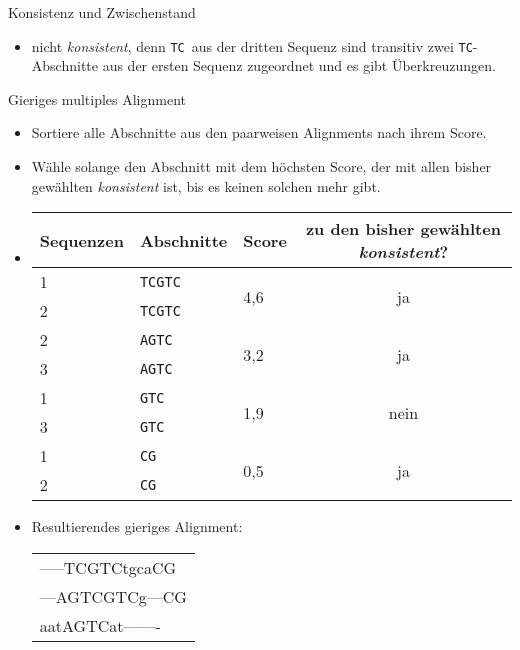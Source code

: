 \documentclass[wide,xcolor={x11names},hyperref={colorlinks=false},pantone312]{beamer}
\begin{document}
\begin{frame}[t, fragile]{Konsistenz und Zwischenstand}
	\vspace{1cm}
	\footnotesize
	\normalsize
	\begin{itemize}
		\item nicht \emph{konsistent}, denn \glqq\texttt{TC}\grqq \ aus der dritten Sequenz sind transitiv zwei \glqq\texttt{TC}\grqq-Abschnitte aus der ersten Sequenz zugeordnet und es gibt Überkreuzungen.
	\end{itemize}
\end{frame}

\begin{frame}[t]{Gieriges multiples Alignment}
	\footnotesize
	\begin{itemize}
		\item Sortiere alle Abschnitte aus den paarweisen Alignments nach ihrem Score.
		\item Wähle solange den Abschnitt mit dem höchsten Score, der mit allen bisher gewählten \emph{konsistent} ist, bis es keinen solchen mehr gibt. \pause
		\item
			\begin{tabular}{lllc}
				Sequenzen & Abschnitte & Score & zu den bisher gewählten \emph{konsistent}? \\
				\hline
				1 & \texttt{TCGTC} & \multirow{2}{*}{4,6} & \multirow{2}{*}{ja} \\
				2 & \texttt{TCGTC} &  &  \\
				2 & \texttt{AGTC}  & \multirow{2}{*}{3,2} & \multirow{2}{*}{ja} \\
				3 & \texttt{AGTC}  &  &  \\
				1 & \texttt{GTC}   & \multirow{2}{*}{1,9} & \multirow{2}{*}{nein} \\
				3 & \texttt{GTC}   &  &  \\
				1 & \texttt{CG}    & \multirow{2}{*}{0,5} & \multirow{2}{*}{ja} \\
				2 & \texttt{CG}    &  &  
			\end{tabular} \pause
		\item Resultierendes gieriges Alignment:
		\ttfamily
			\begin{tabular}{l}
				-----TCGTCtgcaCG \\
				---AGTCGTCg---CG \\
				aatAGTCat------- 
			\end{tabular}
		\normalfont
	\end{itemize}
	\normalsize
\end{frame}
\end{document}
